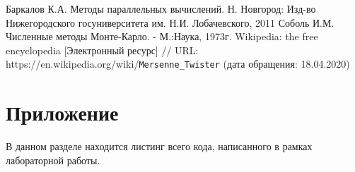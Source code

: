 \documentclass{report}
\begin{document}
\newpage

\begin{thebibliography}{1}
 Баркалов К.А. Методы параллельных вычислений. Н. Новгород: Изд-во Нижегородского госуниверситета им. Н.И. Лобачевского, 2011
 Соболь И.М. Численные методы Монте-Карло. - М.:Наука, 1973г.
 Wikipedia: the free encyclopedia [Электронный ресурс] // URL: https://en.wikipedia.org/wiki/\verb|Mersenne_Twister| (дата обращения: 18.04.2020)
\end{thebibliography}
\newpage

\section*{Приложение}
\indent\par В данном разделе находится листинг всего кода, написанного в рамках лабораторной работы.
















\end{document}
